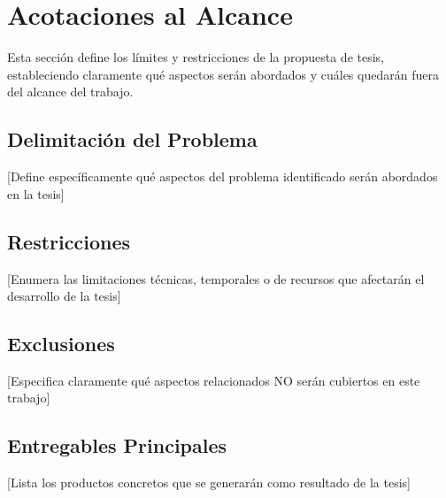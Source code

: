 \section{Acotaciones al Alcance}

Esta sección define los límites y restricciones de la propuesta de tesis, estableciendo claramente qué aspectos serán abordados y cuáles quedarán fuera del alcance del trabajo.

\subsection{Delimitación del Problema}
[Define específicamente qué aspectos del problema identificado serán abordados en la tesis]

\subsection{Restricciones}
[Enumera las limitaciones técnicas, temporales o de recursos que afectarán el desarrollo de la tesis]

\subsection{Exclusiones}
[Especifica claramente qué aspectos relacionados NO serán cubiertos en este trabajo]

\subsection{Entregables Principales}
[Lista los productos concretos que se generarán como resultado de la tesis]